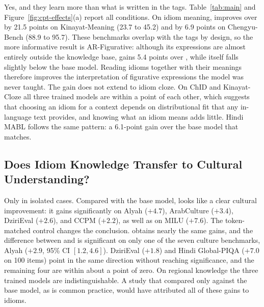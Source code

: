 Yes, and they learn more than what is written in the tags. Table~\ref{tab:main} and Figure~\ref{fig:cpt-effects}(a) report all conditions. On idiom meaning, \idiomcpt{} improves over \random{} by 21.5 points on Kinayat-Meaning (23.7 to 45.2) and by 6.9 points on Chengyu-Bench (88.9 to 95.7). These benchmarks overlap with the tags by design, so the more informative result is AR-Figurative: although its expressions are almost entirely outside the knowledge base, \idiomcpt{} gains 5.4 points over \random{}, while \random{} itself falls slightly below the base model. Reading idioms together with their meanings therefore improves the interpretation of figurative expressions the model was never taught. The gain does not extend to idiom cloze. On ChID and Kinayat-Cloze all three trained models are within a point of each other, which suggests that choosing an idiom for a context depends on distributional fit that any in-language text provides, and knowing what an idiom means adds little. Hindi MABL follows the same pattern: a 6.1-point gain over the base model that \random{} matches. 



\subsection{Does Idiom Knowledge Transfer to Cultural Understanding?}
\label{sec:results-culture}

Only in isolated cases. Compared with the base model, \idiomcpt{} looks like a clear cultural improvement: it gains significantly on Alyah ($+4.7$), ArabCulture ($+3.4$), DziriEval ($+2.6$), and CCPM ($+2.2$), as well as on MILU ($+7.6$). The token-matched control changes the conclusion. \random{} obtains nearly the same gains, and the difference between \idiomcpt{} and \random{} is significant on only one of the seven culture benchmarks, Alyah ($+2.9$, 95\% CI $[1.2, 4.6]$). DziriEval ($+1.8$) and Hindi Global-PIQA ($+7.0$ on 100 items) point in the same direction without reaching significance, and the remaining four are within about a point of zero. On regional knowledge the three trained models are indistinguishable. A study that compared only against the base model, as is common practice, would have attributed all of these gains to idioms.

